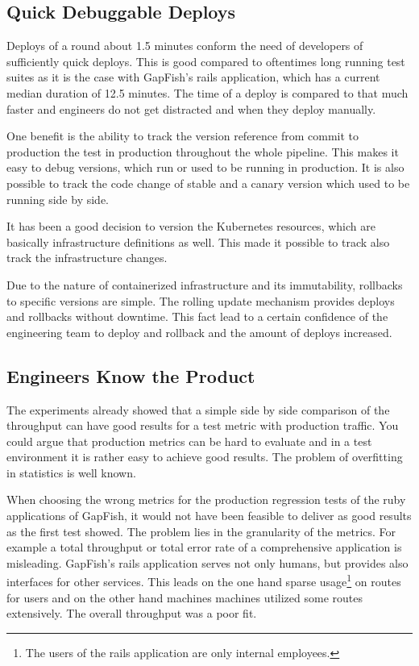 \subsection{Quick Debuggable Deploys}

Deploys of a round about 1.5 minutes conform the need of developers of sufficiently quick
deploys. This is good compared to oftentimes long running test suites as it is the case with
GapFish's rails application, which has a current median duration of 12.5 minutes. The time
of a deploy is compared to that much faster and engineers do not get distracted and when
they deploy manually.

One benefit is the ability to track the version reference from commit to production the
test in production throughout the whole pipeline. This makes it easy to debug versions,
which run or used to be running in production. It is also possible to track the code
change of stable and a canary version which used to be running side by side.

It has been a good decision to version the Kubernetes resources, which are basically
infrastructure definitions as well. This made it possible to track also track the
infrastructure changes.

Due to the nature of containerized infrastructure and its immutability, rollbacks to
specific versions are simple. The rolling update mechanism provides deploys and rollbacks
without downtime. This fact lead to a certain confidence of the engineering team to deploy
and rollback and the amount of deploys increased.

\subsection{Engineers Know the Product}

The experiments already showed that a simple side by side comparison of the throughput can
have good results for a test metric with production traffic. You could argue that
production metrics can be hard to evaluate and in a test environment it is rather easy to
achieve good results. The problem of overfitting in statistics is well known.

When choosing the wrong metrics for the production regression tests of the ruby
applications of GapFish, it would not have been feasible to deliver as good results as the
first test showed. The problem lies in the granularity of the metrics. For example a total
throughput or total error rate of a comprehensive application is misleading. GapFish's
rails application serves not only humans, but provides also interfaces for other
services. This leads on the one hand sparse usage\footnote{The users of the rails
  application are only internal employees.} on routes for users and on the other hand
machines machines utilized some routes extensively. The overall throughput was a poor fit.

